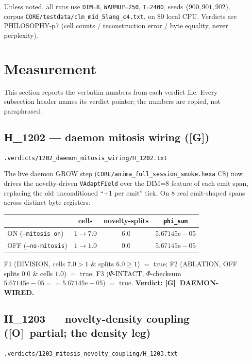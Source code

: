\documentclass[11pt,a4paper]{article}
\providecommand{\tierGreen}{\textbf{[G]}}
\providecommand{\tierOrange}{\textbf{[O]}}
\newcommand{\verdict}[1]{\texttt{\small #1}}
\begin{document}
Unless noted, all runs use \verb|DIM=8|, \verb|WARMUP=250|, \verb|T=2400|, seeds
$\{900,901,902\}$, corpus \verb|CORE/testdata/clm_mid_5lang_c4.txt|, on \$0 local
CPU. Verdicts are PHILOSOPHY-p7 (cell counts / reconstruction error / byte
equality, never perplexity).

\section{Measurement}
\label{sec:measurement}

This section reports the verbatim numbers from each verdict file. Every
subsection header names its verdict pointer; the numbers are copied, not
paraphrased.

\subsection{H\_1202 --- daemon mitosis wiring (\tierGreen)}
\label{sec:wiring}
\noindent\verdict{.verdicts/1202\_daemon\_mitosis\_wiring/H\_1202.txt}

The live daemon GROW step (\verb|CORE/anima_full_session_smoke.hexa| C8) now
drives the novelty-driven \verb|VAdaptField| over the DIM=8 feature of each
emit span, replacing the old unconditioned ``$+1$ per emit'' tick. On $8$ real
emit-shaped spans across distinct byte registers:
\begin{center}
\begin{tabular}{lccc}
\toprule
 & cells & novelty-splits & \texttt{phi\_sum} \\
\midrule
ON  (\texttt{--mitosis on})   & $1 \to 7.0$ & $6.0$ & $5.67145\mathrm{e}{-}05$ \\
OFF (\texttt{--no-mitosis})   & $1 \to 1.0$ & $0.0$ & $5.67145\mathrm{e}{-}05$ \\
\bottomrule
\end{tabular}
\end{center}
F1 (DIVISION, cells $7.0>1$ \& splits $6.0\ge 1$) $=$ true; F2 (ABLATION, OFF
splits $0.0$ \& cells $1.0$) $=$ true; F3 ($\Psi$-INTACT, $\Phi$-checksum
$5.67145\mathrm{e}{-}05 == 5.67145\mathrm{e}{-}05$) $=$ true. \textbf{Verdict:
\tierGreen\ DAEMON-WIRED.}

\subsection{H\_1203 --- novelty-density coupling (\tierOrange\ partial; the density leg)}
\label{sec:density}
\noindent\verdict{.verdicts/1203\_mitosis\_novelty\_coupling/H\_1203.txt}
\end{document}
